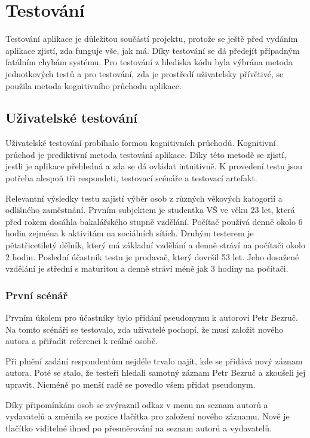 
\chapter{Testování}
        Testování aplikace je důležitou součástí projektu, protože se ještě před vydáním aplikace zjistí, zda funguje vše, jak má. Díky testování se dá předejít případným fatálním chybám systému. Pro testování z hlediska kódu byla výbrána metoda jednotkových testů a pro testování, zda je prostředí uživatelsky přívětivé, se použila metoda kognitivního průchodu aplikace.
        
    \section{Uživatelské testování}
        Uživatelské testování probíhalo formou kognitivních průchodů. Kognitivní průchod je prediktivní metoda testování aplikace. Díky této metodě se zjistí, jestli je aplikace přehledná a zda se dá ovládat intuitivně. K provedení testu jsou potřeba alespoň tři respondeti, testovací scénáře a testovací artefakt. 
        
        Relevantní výsledky testu zajistí výběr osob z různých věkových katogorií a odlišného zaměstnání. Prvním subjektem je studentka VŠ ve věku 23 let, která před rokem dosáhla bakalářského stupně vzdělání. Počítač používá denně okolo 6 hodin zejména k aktivitám na sociálních sítích. Druhým testerem je pětatřicetiletý dělník, který má základní vzdělání a denně stráví na počítači okolo 2 hodin. Poslední účastník testu je prodavač, který dovršil 53 let. Jeho dosažené vzdělání je střední s maturitou a denně stráví méně jak 3 hodiny na počítači.
        
        \subsection{První scénář}
            Prvním úkolem pro účastníky bylo přidání pseudonymu k autorovi Petr Bezruč. Na tomto scénáři se testovalo, zda uživatelé pochopí, že musí založit nového autora a přiřadit referenci k reálné osobě.
            
            Při plnění zadání respondentům nejdéle trvalo najít, kde se přidává nový záznam autora. Poté se stalo, že testeři hledali samotný záznam Petr Bezruč a zkoušeli jej upravit. Nicméně po menší radě se povedlo všem přidat pseudonym.
            
            Díky připomínkám osob se zvýraznil odkaz v menu na seznam autorů a vydavatelů a změnila se pozice tlačítka pro založení nového záznamu. Nově je tlačítko viditelné ihned po přesměrování na seznam autorů a vydavatelů. 

